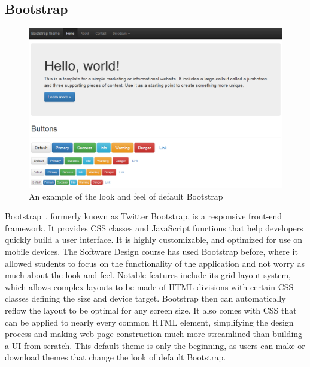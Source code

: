 \documentclass[12pt]{article}
\begin{document}
\subsection{Bootstrap}\label{sec:bootstrap}
\begin{figure}[h!]
\includegraphics[width=\linewidth]{img/bootstrap.png}
\caption{An example of the look and feel of default Bootstrap}
\end{figure}
Bootstrap~\cite{Bootstrap}, formerly known as Twitter Bootstrap, is a responsive front-end framework. 
It provides CSS classes and JavaScript functions that help developers quickly build a user interface. 
It is highly customizable, and optimized for use on mobile devices. 
The Software Design course has used Bootstrap before, where it allowed students to focus on the functionality of the application and not worry as much about the look and feel. 
Notable features include its grid layout system, which allows complex layouts to be made of HTML divisions with certain CSS classes defining the size and device target. 
Bootstrap then can automatically reflow the layout to be optimal for any screen size.
It also comes with CSS that can be applied to nearly every common HTML element, simplifying the design process and making web page construction much more streamlined than building a UI from scratch. 
This default theme is only the beginning, as users can make or download themes that change the look of default Bootstrap.
\end{document}

